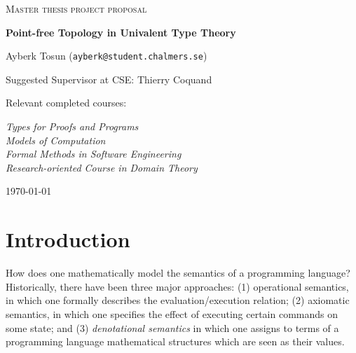 \documentclass{article}
\begin{document}
\begin{titlepage}

\centering
  
{\scshape\LARGE Master thesis project proposal\\}
  
\vspace{0.5cm}
  
{\huge\bfseries Point-free Topology in Univalent Type Theory\\}
  
\vspace{2cm}
  
{\Large Ayberk Tosun (\texttt{ayberk@student.chalmers.se})\\}
  
\vspace{1.0cm}
  
{\large Suggested Supervisor at CSE: Thierry Coquand\\}
  
\vspace{1.5cm}
  
{\large Relevant completed courses:\par}
  
{\itshape Types for Proofs and Programs\\}
{\itshape Models of Computation\\}
{\itshape Formal Methods in Software Engineering\\}
{\itshape Research-oriented Course in Domain Theory\\}
  
\vfill

\vfill
  
{\large \today\\} 

\end{titlepage}
\section{Introduction}

How does one mathematically model the semantics of a programming language? Historically,
there have been three major approaches: (1) operational semantics, in which one formally
describes the evaluation/execution relation; (2) axiomatic semantics, in which one
specifies the effect of executing certain commands on some state; and (3)
\emph{denotational semantics} in which one assigns to terms of a programming language
mathematical structures which are seen as their values.
\end{document}
